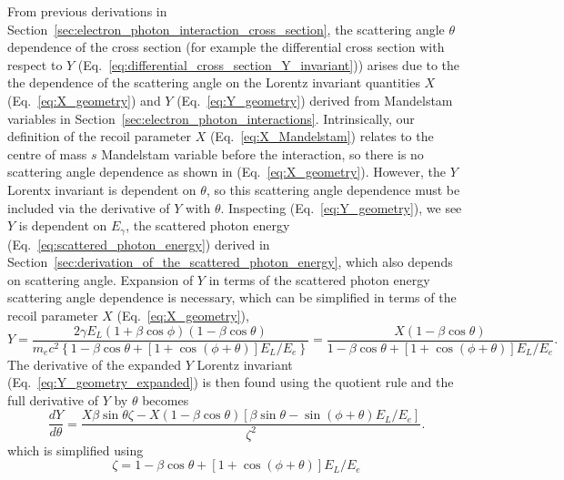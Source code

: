 \documentclass[../main.tex]{subfiles}
\begin{document}
From previous derivations in Section~\ref{sec:electron_photon_interaction_cross_section}, the scattering angle $\theta$ dependence of the cross section (for example the differential cross section with respect to $Y$ (Eq.~\ref{eq:differential_cross_section_Y_invariant})) arises due to the the dependence of the scattering angle on the Lorentz invariant quantities $X$ (Eq.~\ref{eq:X_geometry}) and $Y$ (Eq.~\ref{eq:Y_geometry}) derived from Mandelstam variables in Section~\ref{sec:electron_photon_interactions}. Intrinsically, our definition of the recoil parameter $X$ (Eq.~\ref{eq:X_Mandelstam}) relates to the centre of mass $s$ Mandelstam variable before the interaction, so there is no scattering angle dependence as shown in (Eq.~\ref{eq:X_geometry}). However, the $Y$ Lorentx invariant is dependent on $\theta$, so this scattering angle dependence must be included via the derivative of $Y$ with $\theta$. Inspecting (Eq.~\ref{eq:Y_geometry}), we see $Y$ is dependent on $E_{\gamma}$, the scattered photon energy (Eq.~\ref{eq:scattered_photon_energy}) derived in Section~\ref{sec:derivation_of_the_scattered_photon_energy}, which also depends on scattering angle. Expansion of $Y$ in terms of the scattered photon energy scattering angle dependence is necessary, which can be simplified in terms of the recoil parameter $X$ (Eq.~\ref{eq:X_geometry}),
\begin{equation}
Y = \frac{2\gamma E_{L}\left(1+\beta\cos\phi\right)\left(1-\beta\cos\theta\right)}{m_{e}c^{2}\left\{1-\beta\cos\theta+\left[1+\cos\left(\phi+\theta\right)\right]E_{L}/E_{e}\right\}} = \frac{X\left(1-\beta\cos\theta\right)}{1-\beta\cos\theta+\left[1+\cos\left(\phi+\theta\right)\right]E_{L}/E_{e}}.
\label{eq:Y_geometry_expanded}
\end{equation}
The derivative of the expanded $Y$ Lorentz invariant (Eq.~\ref{eq:Y_geometry_expanded}) is then found using the quotient rule and the full derivative of $Y$ by $\theta$ becomes
\begin{equation}
\frac{dY}{d\theta} = \frac{X\beta\sin\theta\zeta-X\left(1-\beta\cos\theta\right)\left[\beta\sin\theta-\sin\left(\phi+\theta\right)E_{L}/E_{e}\right]}{\zeta^{2}}.
\label{eq:dY_dtheta}
\end{equation}
which is simplified using
\begin{equation}
\zeta = 1-\beta\cos\theta+\left[1+\cos\left(\phi+\theta\right)\right]E_{L}/E_{e}
\label{eq:zeta_simplification}
\end{equation}
\end{document}
